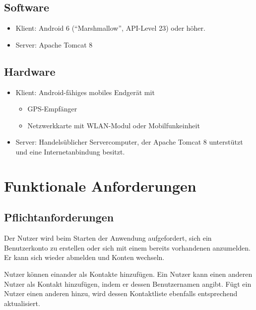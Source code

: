\documentclass[parskip=full,11pt]{scrartcl}
\begin{document}
\subsection{Software}
\begin{itemize}
    \item Klient: Android 6 (\enquote{Marshmallow}, API-Level 23) oder
        höher.
    \item Server: Apache Tomcat 8
\end{itemize}

\subsection{Hardware}
\begin{itemize}
    \item Klient: Android-fähiges mobiles Endgerät mit
        \begin{itemize}
            \item GPS-Empfänger
            \item Netzwerkkarte mit WLAN-Modul oder Mobilfunkeinheit
        \end{itemize}
    \item Server: Handelsüblicher Servercomputer, der Apache Tomcat 8
        unterstützt und eine Internetanbindung besitzt.
\end{itemize}

\pagebreak
\section{Funktionale Anforderungen}

\subsection{Pflichtanforderungen}

%
Der Nutzer wird beim Starten der Anwendung aufgefordert, sich ein
Benutzerkonto zu erstellen oder sich mit einem bereits vorhandenen anzumelden.
Er kann sich wieder abmelden und Konten wechseln.

%
%
%
Nutzer können einander als Kontakte hinzufügen.
Ein Nutzer kann einen anderen Nutzer als Kontakt hinzufügen,
indem er dessen Benutzernamen angibt.
Fügt ein Nutzer einen anderen hinzu,
wird dessen Kontaktliste ebenfalls entsprechend aktualisiert.
\end{document}
